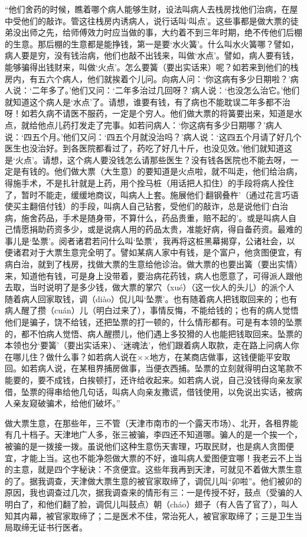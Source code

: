 \documentclass[12pt,UTF8]{ctexbook}
\begin{document}
“他们舍药的时候，瞧着哪个病人能够生财，设法叫病人去栈房找他们治病，在屋中受他们的敲诈。管这往栈房内诱病人，说行话叫‘叫点’。这些事都是做大票的徒弟没出师之先，给师傅效力时应当做的事，大约着不到三年时期，绝不传他们后棚的生意。那后棚的生意都是能挣钱，第一是要‘水火簧’。什么叫水火簧哪？譬如，病人要是穷，没有钱治病，他们也敲不出钱来，叫做‘水点’。譬如，病人要有钱，能够骗得出钱财来，叫做‘火点’。怎么要簧（要出实话来）呢？如若来到他们的栈房内，有五六个病人，他们就挨着个儿问。向病人问：‘你这病有多少日期啦？’病人说：‘二年多了。’他们又问：‘二年多治过几回呀？’病人说：‘也没怎么治它。’他们就知道这个病人是‘水点’了。请想，谁要有钱，有了病也不能耽误二年多都不治呀！如若久病不请医不服药，一定是个穷人。他们做大票的将簧要出来，知道是水点，就给他点儿药打发走了完事。如若问病人：‘你这病有多少日期哪？’病人说：‘四五个月。’他们又问：‘四五个月就没治吗？’病人说：‘这四五个月请了好几个医生也没治好。到各医院都看过了，药吃了好几十斤，也没见效。’他们就知道这是‘火点’。请想，这个病人要没钱怎么请那些医生？没有钱各医院也不能去呀，一定是有钱的。他们做大票（大生意）的要知道是火点啦，就不叫走，他们给治病，得施手术，不是扎针就是上药，用个拴马桩（用话把人扣住）的手段将病人拴住了，暂时不能走，缓缓地商议，叫病人上套。施展他们‘翻钢叠杵’（通过花言巧语使买主翻倍付钱）的手段，叫病人自己钻套，受他们的敲诈，总是说他们‘白治病，施舍药品，手术是随身带，不算什么，药品贵重，赔不起的’。或是叫病人自己情愿捐助药资多少，或是说病人用的药品太贵，准能好病，得自备药资。最难的事儿是‘坠票’。阅者诸君若问什么叫‘坠票’，我再将这桩黑幕揭穿，公诸社会，以便诸君对于大票生意完全明了。譬如某病人家中有钱，是个富户，他贪图便宜，有病白治，就到了栈房，找做大票的生意给他诊治。做大票的也要出簧（要出实情）来，知道他有钱，可是身上没带着，要治病花药钱，病人也愿意了，可得派人跟他去取，当时说明了是多少钱，做大票的掌穴（xué）（这一伙人的头儿）的派个人随着病人回家取钱，调（diào）侃儿叫‘坠票’。也有随着病人把钱取回来的；也有病人醒了攒（cuán）儿（明白过来了），事情反悔，不能给钱的；也有的病人觉悟他们是骗子，饶不给钱，还把坠票的打一顿的，什么情形都有。可是有本领的坠票的，都不怕病人觉悟、病人醒攒儿，他们遇上多狡猾的人也能把钱取回来。坠票的本领也分‘要簧’（要出实话来）、‘迷魂法’，他们跟着病人取款，走在路上问病人你在哪儿住？做什么事？如若病人说在××地方，在某商店做事，这钱便能平安取回。如若病人说，在某租界捕房做事，当便衣西捕。坠票的立刻就得明白这笔款不能要的，要不成钱，白挨顿打，还许给收起来。如若病人说，自己没钱得向亲友家借，坠票的得串给他几句话，叫病人向亲友撒谎，借钱使用，以免说出实话，被病人亲友窥破骗术，给他们破坏。”

做大票生意，在那些年，三不管（天津市南市的一个露天市场）、北开，各租界能有几十档子。天津地广人多，张三被骗，李四还不知道哪。骗人的是一个挨一个，被骗的是一拨接一拨。虽说他们这种生意伤天害理，巧取民财，也是病人贪图便宜，才能上当。这也不能净怨做大票的不好，谁叫病人爱图便宜哪！我老云不上当的主意，就是四个字秘诀：不贪便宜。这些年我再到天津，可就见不着做大票生意的了。据我调查，天津做大票生意的被官家取缔了，调侃儿叫“卯啦”。他们被卯的原因，我也调查过几次，据我调查来的情形有三：一是传授不好，鼓点（受骗的人明白了，和他们翻了脸，调侃儿叫鼓点）朝（cháo）翅子（有人告了官了），叫人知其内幕，被官家取缔了；二是医术不佳，常治死人，被官家取缔了；三是卫生当局取缔无证书行医者。
\end{document}
